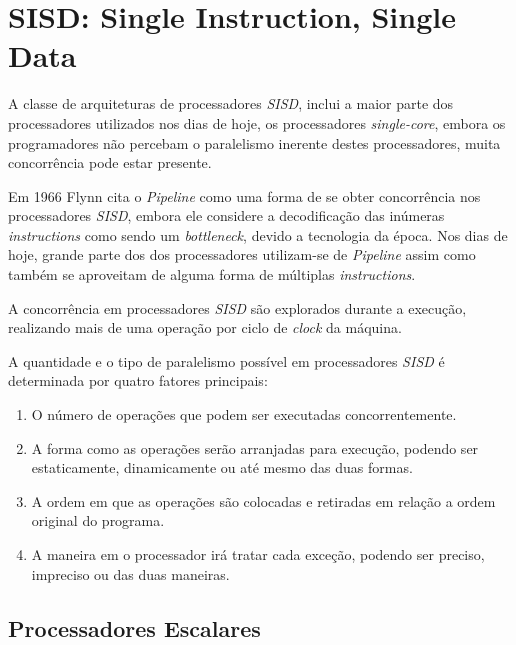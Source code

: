 \section{SISD: Single Instruction, Single Data}

A classe de arquiteturas de processadores \textit{SISD}, inclui a 
maior parte dos processadores utilizados nos dias de hoje, os processadores 
\textit{single-core}, embora os programadores não percebam o paralelismo 
inerente destes processadores, muita concorrência pode estar presente.  

Em 1966 Flynn cita o \textit{Pipeline} como uma forma de se obter concorrência 
nos processadores \textit{SISD}, embora ele considere a decodificação das 
inúmeras \textit{instructions} como sendo um \textit{bottleneck}, devido a 
tecnologia da época. 
Nos dias de hoje, grande parte dos dos processadores 
utilizam-se de \textit{Pipeline} assim como também se aproveitam de alguma forma 
de múltiplas \textit{instructions}.

A concorrência em processadores \textit{SISD} são explorados durante a execução,
realizando mais de uma operação por ciclo de \textit{clock} da máquina.

A quantidade e o tipo de paralelismo possível em processadores \textit{SISD}
é determinada por quatro fatores principais:

\begin{enumerate}
        \item O número de operações que podem ser executadas concorrentemente.
        \item A forma como as operações serão arranjadas para execução,
                podendo ser estaticamente, dinamicamente ou até mesmo das duas
                formas.
        \item A ordem em que as operações são colocadas e retiradas em relação
                a ordem original do programa.
        \item A maneira em o processador irá tratar cada exceção, podendo ser 
                preciso, impreciso ou das duas maneiras.
\end{enumerate}

\subsection{Processadores Escalares}

